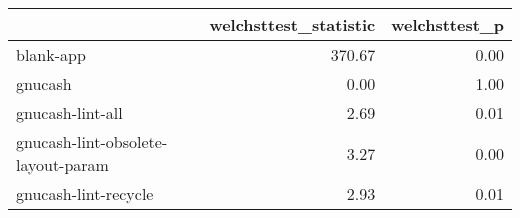\begin{tabular}{lrr}
\toprule
{} &  welchsttest\_statistic &  welchsttest\_p \\
\midrule
blank-app                          &                 370.67 &           0.00 \\
gnucash                            &                   0.00 &           1.00 \\
gnucash-lint-all                   &                   2.69 &           0.01 \\
gnucash-lint-obsolete-layout-param &                   3.27 &           0.00 \\
gnucash-lint-recycle               &                   2.93 &           0.01 \\
\bottomrule
\end{tabular}
